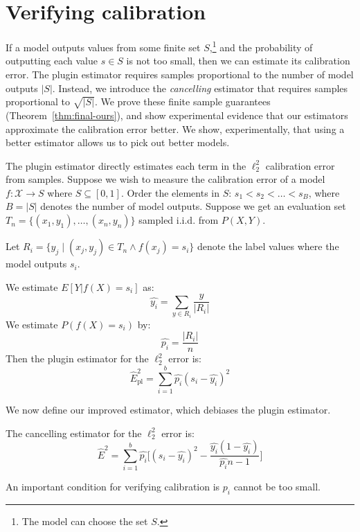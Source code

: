 \section{Verifying calibration}
\label{sec:verifying_calibration}

If a model outputs values from some finite set $S$,\footnote{The model can choose the set $S$.} and the probability of outputting each value $s \in S$ is not too small, then we can estimate its calibration error. The plugin estimator requires samples proportional to the number of model outputs $|S|$. Instead, we introduce the \emph{cancelling} estimator that requires samples proportional to $\sqrt{|S|}$. We prove these finite sample guarantees (Theorem~\ref{thm:final-ours}), and show experimental evidence that our estimators approximate the calibration error better. We show, experimentally, that using a better estimator allows us to pick out better models.

The plugin estimator directly estimates each term in the $\ell_2^2$ calibration error from samples. Suppose we wish to measure the calibration error of a model $f : \mathcal{X} \to S$ where $S \subseteq [0, 1]$. Order the elements in $S$: $s_1 < s_2 < \dots < s_B$, where $B = |S|$ denotes the number of model outputs. Suppose we get an evaluation set $T_n = \{(x_1, y_1), \dots, (x_n, y_n)\}$ sampled i.i.d. from $P(X, Y)$.

\begin{definition}
Let $R_i = \{ y_j \; | \; (x_j, y_j) \in T_n\wedge f(x_j) = s_i \}$ denote the label values where the model outputs $s_i$.

We estimate $E[Y | f(X) = s_i]$ as:
\[ \hat{y_i} = \sum_{y \in R_i} \frac{y}{|R_i|} \] 
We estimate $P(f(X) = s_i)$ by:
\[ \hat{p_i} = \frac{|R_i|}{n} \]
Then the plugin estimator for the $\ell_2^2$ error is:
\[ \hat{E}_{\mbox{pl}}^2 = \sum_{i=1}^b \hat{p_i} (s_i - \hat{y_i})^2 \]
\end{definition}

We now define our improved estimator, which debiases the plugin estimator.

\begin{definition}
The cancelling estimator for the $\ell_2^2$ error is:
\[ \hat{E}^2 = \sum_{i=1}^b \hat{p_i} \Big[ (s_i - \hat{y_i})^2 - \frac{\hat{y_i}(1 - \hat{y_i})}{\hat{p_i}n-1} \Big] \]
\end{definition}

An important condition for verifying calibration is $p_i$ cannot be too small.

